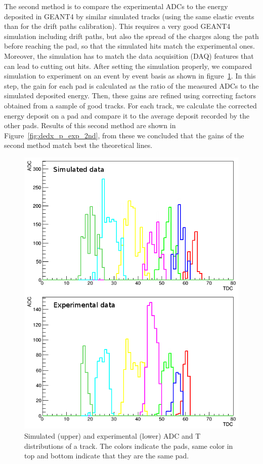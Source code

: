 \documentclass[twocolumn,showpacs,superscriptaddress,groupedaddress]{revtex4}
\begin{document}
The second method is to compare the experimental ADCs to the energy deposited in 
GEANT4 by similar simulated tracks (using the same elastic events than for the drift 
paths calibration). This requires a very good GEANT4 simulation 
including drift paths, but also the spread of the charges along the path
before reaching the pad, so that the simulated hits match the experimental 
ones. Moreover, the simulation has to match the data acquisition (DAQ) features 
that can lead to cutting out hits. After setting the simulation properly, we 
compared simulation to experiment on an event by event basis as shown in 
figure~\ref{fig:EVENT_adc_tdc}. In this step, the gain for each pad is calculated 
as the ratio of the measured ADCs to the simulated deposited energy.  
Then, these gains are refined using correcting factors obtained from a 
sample of good tracks. For each track, we calculate the corrected 
energy deposit on a pad and compare it to the average
deposit recorded by the other pads. 
Results of this second method are shown in Figure~\ref{fig:dedx_p_exp_2nd},
from these we concluded that the gains of the 
second method match best the theoretical lines.

\begin{figure}[tb]
   \centering
\includegraphics[scale=0.350]{fig/EVENT_adc_tdc.png}
\caption{Simulated (upper) and experimental (lower) ADC and T distributions 
of a track. The colors indicate the pads, same color in top and bottom indicate 
that they are the same pad.}
\label{fig:EVENT_adc_tdc}
\end{figure}
\end{document}
